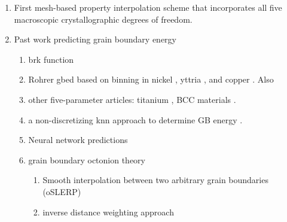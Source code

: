 \begin{enumerate}
    \item First mesh-based property interpolation scheme that incorporates all five macroscopic crystallographic degrees of freedom.
    \item Past work predicting grain boundary energy
    \begin{enumerate}
        \item \gls{brk} function \cite{Bulatov2014GrainMetals}
        \item Rohrer \gls{gbed} based on binning in nickel \cite{Li2009RelativeNickel}, yttria \cite{Dillon2009CharacterizationFIB}, and copper \cite{Randle2008Five-parameterCopper}. Also \cite{Rohrer2010DerivingData}
        \item other five-parameter articles: titanium \cite{Farabi2018Five-parameterTitanium}, BCC materials \cite{Ratanaphan2015GrainMetals}.
        \item a non-discretizing \gls{knn} approach to determine GB energy \cite{Shen2019DeterminingSpace}.
        \item Neural network predictions \cite{EcheverriRestrepo2014UsingEnergies}
        \item grain boundary octonion theory \cite{Francis2019ABoundaries,Chesser2020LearningProperties}
         \begin{enumerate}
             \item Smooth interpolation between two arbitrary grain boundaries (oSLERP) \cite{Francis2019ABoundaries}
             \item inverse distance weighting approach \cite{Chesser2020LearningProperties}
         \end{enumerate}
    \end{enumerate}
    

\end{enumerate}
